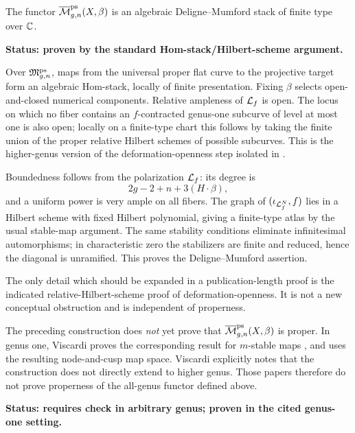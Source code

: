 \documentclass[12pt]{memoir}
\begin{document}
\begin{Prop}
    \label{prop-ps-map-algebraic-dm}
    The functor \(\overline{\mathcal{M}}^{\operatorname{\mathrm{ps}}}_{g,n}(X,\beta)\) is an algebraic
    Deligne--Mumford stack of finite type over \(\mathbb{C}\).

    \noindent\textbf{Status: proven by the standard Hom-stack/Hilbert-scheme
    argument.}
\end{Prop}

\begin{ptcbp}
    Over \(\mathfrak M^{\operatorname{\mathrm{ps}}}_{g,n}\), maps from the universal proper flat
    curve to the projective target form an algebraic Hom-stack, locally of
    finite presentation.  Fixing \(\beta\) selects open-and-closed numerical
    components.  Relative ampleness of \(\mathcal{L}_f\) is open.  The locus on which
    no fiber contains an \(f\)-contracted genus-one subcurve of level at most
    one is also open; locally on a finite-type chart this follows by taking
    the finite union of the proper relative Hilbert schemes of possible
    subcurves.  This is the higher-genus version of the
    deformation-openness step isolated in
    \cite[Section~3.1]{viscardi2010alternatecompactificationsmodulispace}.

    Boundedness follows from the polarization \(\mathcal{L}_f\): its degree is
    \[
        2g-2+n+3(H\cdot\beta),
    \]
    and a uniform power is very ample on all fibers.  The graph of
    \((\iota_{\mathcal{L}_f^N},f)\) lies in a Hilbert scheme with fixed Hilbert
    polynomial, giving a finite-type atlas by the usual stable-map argument.
    The same stability conditions eliminate infinitesimal automorphisms;
    in characteristic zero the stabilizers are finite and reduced, hence the
    diagonal is unramified.  This proves the Deligne--Mumford assertion.

    The only detail which should be expanded in a publication-length proof is
    the indicated relative-Hilbert-scheme proof of deformation-openness.  It
    is not a new conceptual obstruction and is independent of properness.
\end{ptcbp}

\begin{Warn}
    The preceding construction does \emph{not} yet prove that
    \(\overline{\mathcal{M}}^{\operatorname{\mathrm{ps}}}_{g,n}(X,\beta)\) is proper.  In genus one, Viscardi proves
    the corresponding result for \(m\)-stable maps
    \cite[Theorem~3.1]{viscardi2010alternatecompactificationsmodulispace}, and
    \cite{battistella2018reducedinvariantscuspidalmaps} uses the resulting
    node-and-cusp map space.  Viscardi explicitly notes that the construction
    does not directly extend to higher genus.  Those papers therefore do not
    prove properness of the all-genus functor defined above.

    \noindent\textbf{Status: requires check in arbitrary genus; proven in the
    cited genus-one setting.}
\end{Warn}
\end{document}
